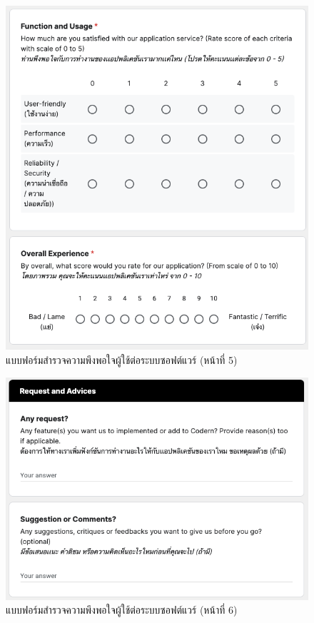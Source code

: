 \documentclass[12pt,one side,openright,a4paper]{cpe-thesis-th}
\begin{document}
\begin{figure}[H]
    \centering
    \includegraphics[width=15cm]{figure/results/forms/survey-google-p3-2.png}
    \caption[แบบฟอร์มสำรวจความพึงพอใจผู้ใช้ต่อระบบซอฟต์แวร์ (หน้าที่ 5)]{แบบฟอร์มสำรวจความพึงพอใจผู้ใช้ต่อระบบซอฟต์แวร์ (หน้าที่ 5)}
\end{figure}

\begin{figure}[H]
    \centering
    \includegraphics[width=15cm]{figure/results/forms/survey-google-p3-3.png}
    \caption[แบบฟอร์มสำรวจความพึงพอใจผู้ใช้ต่อระบบซอฟต์แวร์ (หน้าที่ 6)]{แบบฟอร์มสำรวจความพึงพอใจผู้ใช้ต่อระบบซอฟต์แวร์ (หน้าที่ 6)}
\end{figure}
\end{document}
